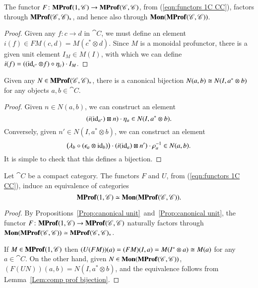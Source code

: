 \documentclass[12pt,oneside,article,draft]{memoir}
\begin{document}
\begin{enumerate}
\begin{proposition}\label{Prop:canonical unit}
	The functor $F\colon\mathbf{MProf}(1,\mathscr{C})\to\mathbf{MProf}(\mathscr{C},\mathscr{C})$, from (\ref{eqn:functors 1C CC}), factors through $\mathbf{MProf}(\mathscr{C},\mathscr{C})_*$, and hence also through $\mathbf{Mon}(\mathbf{MProf}(\mathscr{C},\mathscr{C}))$.
\end{proposition}
\begin{proof}
	Given any $f\colon c\to d$ in $\cat{C}$, we must define an element $i(f)\in FM(c,d)=M(c^*\otimes d)$.
	Since $M$ is a monoidal profunctor, there is a given unit element $I_M\in M(I)$, with which we can define $i(f)=((\operatorname{id}_{c^*}\otimes f)\circ\eta_c)\cdot I_M$.
\end{proof}

\begin{lemma}\label{Lem:comp prof bijection}
	Given any $N\in\mathbf{MProf}(\mathscr{C},\mathscr{C})_*$, there is a canonical bijection $N(a,b)\cong N(I,a^*\otimes b)$ for any objects $a,b\in\cat{C}$.
\end{lemma}
\begin{proof}
	Given $n\in N(a,b)$, we can construct an element
	\[
		(i(\operatorname{id}_{a^*})\boxtimes n)\cdot\eta_a \in N(I,a^*\otimes b).
	\]
	Conversely, given $n'\in N(I,a^*\otimes b)$, we can construct an element 
	\[
		\bigl(\lambda_b\circ(\epsilon_a\otimes\operatorname{id}_b)\bigr)\cdot(i(\operatorname{id}_a)\boxtimes n')\cdot\rho_a^{-1} \in N(a,b).
	\]
	It is simple to check that this defines a bijection.
\end{proof}

\begin{proposition}\label{Prop:mon prof equivalence}
	Let $\cat{C}$ be a compact category.
	The functors $F$ and $U$, from (\ref{eqn:functors 1C CC}), induce an equivalence of categories 
	\[
		\mathbf{MProf}(1,\mathscr{C})\simeq\mathbf{Mon}(\mathbf{MProf}(\mathscr{C},\mathscr{C})).
	\]
\end{proposition}
\begin{proof}
	By Propositions~\ref{Prop:canonical unit}~and~\ref{Prop:canonical unit}, the functor $F\colon\mathbf{MProf}(1,\mathscr{C}) \to \mathbf{MProf}(\mathscr{C},\mathscr{C})$ naturally factors through $\mathbf{Mon}(\mathbf{MProf}(\mathscr{C},\mathscr{C}))\simeq\mathbf{MProf}(\mathscr{C},\mathscr{C})_*$. 

	If $M\in\mathbf{MProf}(1,\mathscr{C})$ then $(U(FM))(a)=(FM)(I,a)=M(I^*\otimes a)\cong M(a)$ for any $a\in\cat{C}$.
	On the other hand, given $N\in\mathbf{Mon}(\mathbf{MProf}(\mathscr{C},\mathscr{C}))$, $(F(UN))(a,b)=N(I,a^*\otimes b)$, and the equivalence follows from Lemma~\ref{Lem:comp prof bijection}.
\end{proof}


\end{enumerate}
\end{document}
